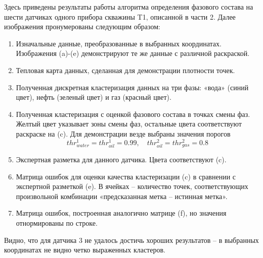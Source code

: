 \par
Здесь приведены результаты работы алгоритма определения фазового состава на шести датчиках одного прибора скважины T1, описанной в части 2. Далее изображения пронумерованы следующим образом:
\begin{enumerate}[label=(\alph*)]
	\item
	Изначальные данные, преобразованные в выбранных координатах. Изображения (a)-(e) демонстрируют те же данные с различной раскраской.
	\item
	Тепловая карта данных, сделанная для демонстрации плотности точек.
	\item
	Полученная дискретная кластеризация данных на три фазы: «вода» (синий цвет), нефть (зеленый цвет) и газ (красный цвет).
	\item
	Полученная кластеризация с оценкой фазового состава в точках смены фаз. Желтый цвет указывает зоны смены фаз, остальные цвета соответствуют раскраске на (c). Для демонстрации везде выбраны значения порогов $$thr_{water}^1=thr_{oil}^1=0.99,\quad thr_{oil}^2=thr_{gas}^2=0.8$$ 
	\item
	Экспертная разметка для данного датчика. Цвета соответствуют (c).
	\item
	Матрица ошибок для оценки качества кластеризации (c) в сравнении с экспертной разметкой (e). В ячейках – количество точек, соответствующих произвольной комбинации «предсказанная метка – истинная метка».
	\item
	Матрица ошибок, построенная аналогично матрице (f), но значения отнормированы по строке.
\end{enumerate}
\par
Видно, что для датчика 3 не удалось достичь хороших результатов – в выбранных координатах не видно четко выраженных кластеров.

